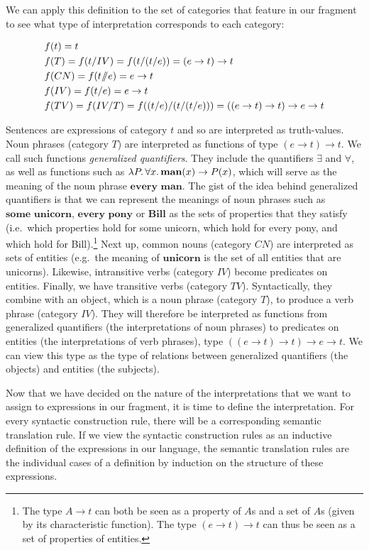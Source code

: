 We can apply this definition to the set of categories that feature in our
fragment to see what type of interpretation corresponds to each category:

\begin{align*}
  &f(t) = t \\
  &f(T) = f(t / IV) = f(t / (t / e)) =  (e \to t) \to t \\
  &f(CN) = f(t /\!\!/ e) = e \to t \\
  &f(IV) = f(t / e) = e \to t \\
  &f(TV) = f(IV / T) = f ((t / e) / (t / (t / e))) = ((e \to t) \to t) \to e \to t
\end{align*}

Sentences are expressions of category $t$ and so are interpreted as
truth-values. Noun phrases (category $T$) are interpreted as functions of
type $(e \to t) \to t$. We call such functions \emph{generalized
  quantifiers}. They include the quantifiers $\exists$ and $\forall$, as
well as functions such as $\lambda P.\, \forall x.\, \textbf{man}(x) \to P(x)$,
which will serve as the meaning of the noun phrase $\textbf{every
  man}$. The gist of the idea behind generalized quantifiers is that we can
represent the meanings of noun phrases such as $\textbf{some unicorn}$,
$\textbf{every pony}$ or $\textbf{Bill}$ as the sets of properties that
they satisfy (i.e.\ which properties hold for some unicorn, which hold for
every pony, and which hold for Bill).\footnote{The type $A \to t$ can both
  be seen as a property of $A$s and a set of $A$s (given by its
  characteristic function). The type $(e \to t) \to t$ can thus be seen as
  a set of properties of entities.} Next up, common nouns (category $CN$)
are interpreted as sets of entities (e.g.\ the meaning of
$\textbf{unicorn}$ is the set of all entities that are unicorns). Likewise,
intransitive verbs (category $IV$) become predicates on entities. Finally,
we have transitive verbs (category $TV$). Syntactically, they combine with
an object, which is a noun phrase (category $T$), to produce a verb phrase
(category $IV$). They will therefore be interpreted as functions from
generalized quantifiers (the interpretations of noun phrases) to predicates
on entities (the interpretations of verb phrases), type
$((e \to t) \to t) \to e \to t$. We can view this type as the type of
relations between generalized quantifiers (the objects) and entities (the
subjects).

Now that we have decided on the nature of the interpretations that we want
to assign to expressions in our fragment, it is time to define the
interpretation. For every syntactic construction rule, there will be a
corresponding semantic translation rule. If we view the syntactic
construction rules as an inductive definition of the expressions in our
language, the semantic translation rules are the individual cases of a
definition by induction on the structure of these expressions.

